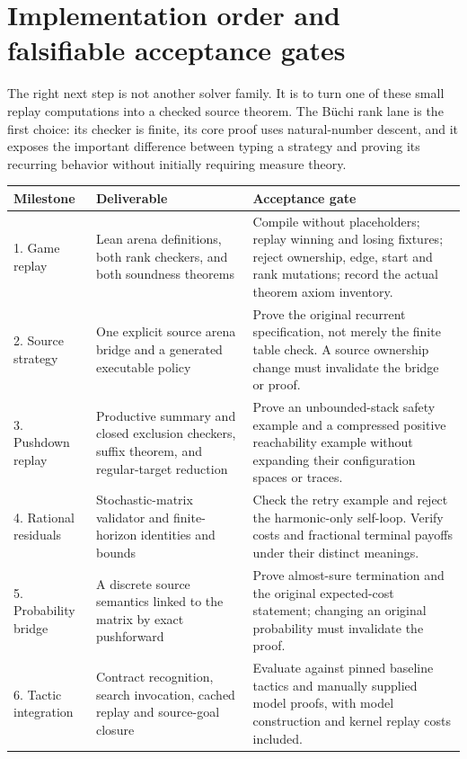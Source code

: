 \section{Implementation order and falsifiable acceptance gates}
\label{sec:roadmap}

The right next step is not another solver family. It is to turn one of these
small replay computations into a checked source theorem. The B\"uchi rank lane
is the first choice: its checker is finite, its core proof uses natural-number
descent, and it exposes the important difference between typing a strategy and
proving its recurring behavior without initially requiring measure theory.

\begin{longtable}{@{}p{}p{}p{}@{}}
\toprule
Milestone & Deliverable & Acceptance gate \\
\midrule\endhead
1. Game replay & Lean arena definitions, both rank checkers, and both soundness theorems & Compile without placeholders; replay winning and losing fixtures; reject ownership, edge, start and rank mutations; record the actual theorem axiom inventory. \\
2. Source strategy & One explicit source arena bridge and a generated executable policy & Prove the original recurrent specification, not merely the finite table check. A source ownership change must invalidate the bridge or proof. \\
3. Pushdown replay & Productive summary and closed exclusion checkers, suffix theorem, and regular-target reduction & Prove an unbounded-stack safety example and a compressed positive reachability example without expanding their configuration spaces or traces. \\
4. Rational residuals & Stochastic-matrix validator and finite-horizon identities and bounds & Check the retry example and reject the harmonic-only self-loop. Verify costs and fractional terminal payoffs under their distinct meanings. \\
5. Probability bridge & A discrete source semantics linked to the matrix by exact pushforward & Prove almost-sure termination and the original expected-cost statement; changing an original probability must invalidate the proof. \\
6. Tactic integration & Contract recognition, search invocation, cached replay and source-goal closure & Evaluate against pinned baseline tactics and manually supplied model proofs, with model construction and kernel replay costs included. \\
\bottomrule
\end{longtable}

